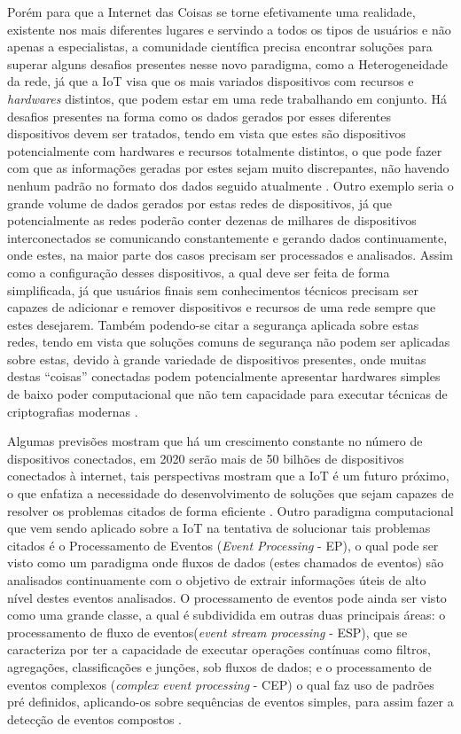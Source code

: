 \documentclass[ti,table]{texufpel} %
\begin{document}
Porém para que a Internet das Coisas se torne efetivamente uma realidade, existente nos mais diferentes lugares e servindo a todos os tipos de usuários e não apenas a especialistas, a comunidade científica precisa encontrar soluções para superar alguns desafios presentes nesse novo paradigma, como a Heterogeneidade da rede, já que a IoT visa que os mais variados dispositivos com recursos e \textit{hardwares} distintos, que podem estar em uma rede trabalhando em conjunto. Há desafios presentes na forma como os dados gerados por esses diferentes dispositivos devem ser tratados, tendo em vista que estes são dispositivos potencialmente com hardwares e recursos totalmente distintos, o que pode fazer com que as informações geradas por estes sejam muito discrepantes, não havendo nenhum padrão no formato dos dados seguido atualmente \cite{agrawal2013survey}. Outro exemplo seria o grande volume de dados gerados por estas redes de dispositivos, já que potencialmente as redes poderão conter dezenas de milhares de dispositivos interconectados se comunicando constantemente e gerando dados continuamente, onde estes, na maior parte dos casos precisam ser processados e analisados. Assim como a configuração desses dispositivos, a qual deve ser feita de forma simplificada, já que usuários finais sem conhecimentos técnicos precisam ser capazes de adicionar e remover dispositivos e recursos de uma rede sempre que estes desejarem. Também podendo-se citar a segurança aplicada sobre estas redes, tendo em vista que soluções comuns de segurança não podem ser aplicadas sobre estas,  devido à grande variedade de dispositivos presentes, onde muitas destas ``coisas'' conectadas podem potencialmente apresentar hardwares simples de baixo poder computacional que não tem capacidade para executar técnicas de criptografias modernas \cite{agrawal2013survey}. 

  

  

Algumas previsões mostram que há um crescimento constante no número de dispositivos conectados, em 2020 serão mais de 50 bilhões de dispositivos conectados à internet, tais perspectivas mostram que a IoT é um futuro próximo, o que enfatiza a necessidade do desenvolvimento de soluções que sejam capazes de resolver os problemas citados de forma eficiente \cite{xavier2016smart}. Outro paradigma computacional que vem sendo aplicado sobre a IoT na tentativa de solucionar tais problemas citados é o  Processamento de Eventos (\textit{Event Processing} - EP), o qual pode ser visto como um paradigma onde fluxos de dados (estes chamados de eventos) são analisados continuamente com o objetivo de extrair informações úteis de alto nível destes eventos analisados. O processamento de eventos pode ainda ser visto como uma grande classe, a qual é subdividida em outras duas principais áreas: o processamento de fluxo de eventos(\textit{event stream processing} - ESP), que se caracteriza por ter a capacidade de executar operações contínuas como filtros, agregações, classificações e junções, sob fluxos de dados; e o processamento de eventos complexos (\textit{complex event processing} - CEP) o qual faz uso de padrões pré definidos, aplicando-os sobre sequências de eventos simples, para assim fazer a detecção de eventos compostos \cite{dayarathna2018recent}. 
\end{document}
